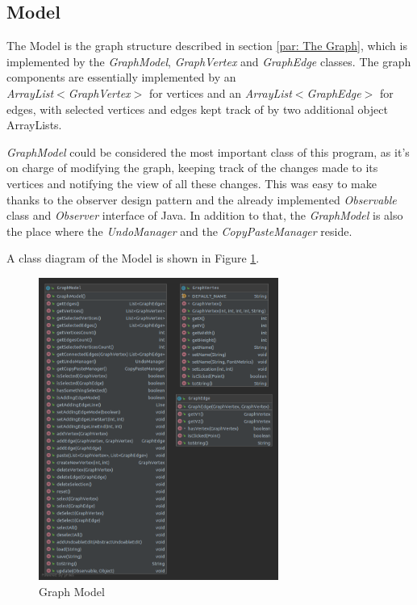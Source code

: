 \documentclass[a4paper]{article}
\begin{document}
\subsection{Model}
\par The Model is the graph structure described in section \ref{par: The Graph}, which is implemented by the \textit{GraphModel}, \textit{GraphVertex} and \textit{GraphEdge} classes. The graph components are essentially implemented by an\\ \textit{ArrayList$<$GraphVertex$>$} for vertices and an  \textit{ArrayList$<$GraphEdge$>$} for edges, with selected vertices and edges kept track of by two additional object ArrayLists. 
\par \textit{GraphModel} could be considered the most important class of this program, as it's on charge of modifying the graph, keeping track of the changes made to its vertices and notifying the view of all these changes. This was easy to make thanks to the observer design pattern and the already implemented \textit{Observable} class and \textit{Observer} interface of Java. In addition to that, the \textit{GraphModel} is also the place where the \textit{UndoManager} and the \textit{CopyPasteManager} reside.
\par A class diagram of the Model is shown in Figure \ref{fig: Model}.

\begin{figure}[h!]
    \centering
    \includegraphics[width=0.7\textwidth]{im/Model.png}
    \caption{Graph Model}
    \label{fig: Model}
\end{figure}
\end{document}
